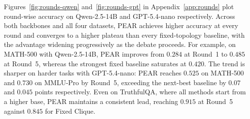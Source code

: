 Figures~\ref{fig:rounds-qwen} and~\ref{fig:rounds-gpt} in Appendix~\ref{app:rounds} plot round-wise accuracy on Qwen-2.5-14B and GPT-5.4-nano respectively. Across both backbones and all four datasets, PEAR achieves higher accuracy at every round and converges to a higher plateau than every fixed-topology baseline, with the advantage widening progressively as the debate proceeds. For example, on MATH-500 with Qwen-2.5-14B, PEAR improves from $0.284$ at Round~1 to $0.485$ at Round~5, whereas the strongest fixed baseline saturates at $0.420$. The trend is sharper on harder tasks with GPT-5.4-nano: PEAR reaches $0.525$ on MATH-500 and $0.730$ on MMLU-Pro by Round~5, exceeding the next-best baseline by $0.07$ and $0.045$ points respectively. Even on TruthfulQA, where all methods start from a higher base, PEAR maintains a consistent lead, reaching $0.915$ at Round~5 against $0.845$ for Fixed Clique.



